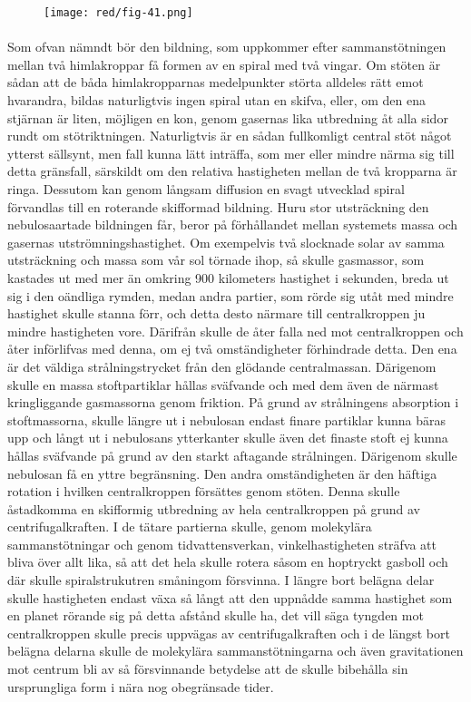 \documentclass[a4paper, 12pt, oneside, swedish]{article}
\begin{document}
\begin{figure}[H]
\centering
\texttt{[image: red/fig-41.png]}
\caption{}
\end{figure}
\paragraph{}
Som ofvan nämndt bör den bildning, som uppkommer efter sammanstötningen mellan två himlakroppar få formen av en spiral med två vingar. Om stöten är sådan att de båda himlakropparnas medelpunkter störta alldeles rätt emot hvarandra, bildas naturligtvis ingen spiral utan en skifva, eller, om den ena stjärnan är liten, möjligen en kon, genom gasernas lika utbredning åt alla sidor rundt om stötriktningen. Naturligtvis är en sådan fullkomligt central stöt något ytterst sällsynt, men fall kunna lätt inträffa, som mer eller mindre närma sig till detta gränsfall, särskildt om den relativa hastigheten mellan de två kropparna är ringa. Dessutom kan genom långsam diffusion en svagt utvecklad spiral förvandlas till en roterande skifformad bildning. Huru stor utsträckning den nebulosaartade bildningen får, beror på förhållandet mellan systemets massa och gasernas utströmningshastighet. Om exempelvis två slocknade solar av samma utsträckning och massa som vår sol törnade ihop, så skulle gasmassor, som kastades ut med mer än omkring 900 kilometers hastighet i sekunden, breda ut sig i den oändliga rymden, medan andra partier, som rörde sig utåt med mindre hastighet skulle stanna förr, och detta desto närmare till centralkroppen ju mindre hastigheten vore. Därifrån skulle de åter falla ned mot centralkroppen och åter införlifvas med denna, om ej två omständigheter förhindrade detta. Den ena är det väldiga strålningstrycket från den glödande centralmassan. Därigenom skulle en massa stoftpartiklar hållas sväfvande och med dem även de närmast kringliggande gasmassorna genom friktion. På grund av strålningens absorption i stoftmassorna, skulle längre ut i nebulosan endast finare partiklar kunna bäras upp och långt ut i nebulosans ytterkanter skulle även det finaste stoft ej kunna hållas sväfvande på grund av den starkt aftagande strålningen. Därigenom skulle nebulosan få en yttre begränsning. Den andra omständigheten är den häftiga rotation i hvilken centralkroppen försättes genom stöten. Denna skulle åstadkomma en skifformig utbredning av hela centralkroppen på grund av centrifugalkraften. I de tätare partierna skulle, genom molekylära sammanstötningar och genom tidvattensverkan, vinkelhastigheten sträfva att bliva över allt lika, så att det hela skulle rotera såsom en hoptryckt gasboll och där skulle spiralstrukutren småningom försvinna. I längre bort belägna delar skulle hastigheten endast växa så långt att den uppnådde samma hastighet som en planet rörande sig på detta afstånd skulle ha, det vill säga tyngden mot centralkroppen skulle precis uppvägas av centrifugalkraften och i de längst bort belägna delarna skulle de molekylära sammanstötningarna och även gravitationen mot centrum bli av så försvinnande betydelse att de skulle bibehålla sin ursprungliga form i nära nog obegränsade tider.
\end{document}

